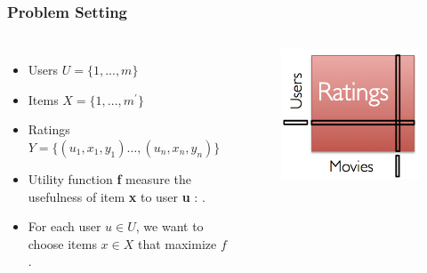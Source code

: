\documentclass[10pt,handout,english]{beamer}
\begin{document}
			\begin{frame}
			\frametitle{Problem Setting}
				\begin{columns}[c]
						{\small \begin{itemize}
							\item Users $U = \{1, ... , m\}$
							\item Items $X = \{1, ... , m^\prime\}$
							\item Ratings $Y = \{(u_1, x_1, y_1)\ldots, (u_n, x_n, y_n)\}$
							\item Utility function \textbf{f} measure the usefulness of item \textbf{x} to user \textbf{u} : .
							\item For each user \textbf{$u\in U$}, we want to choose items \textbf{$x \in X$} that maximize \textbf{$f$}.\\
							\end{itemize}
						}
						\begin{figure}[h!]
			            	\centering
			                \includegraphics[width=\textwidth]{matrix_rating.png}
				        \end{figure}
				\end{columns}
			\end{frame}
\end{document}
